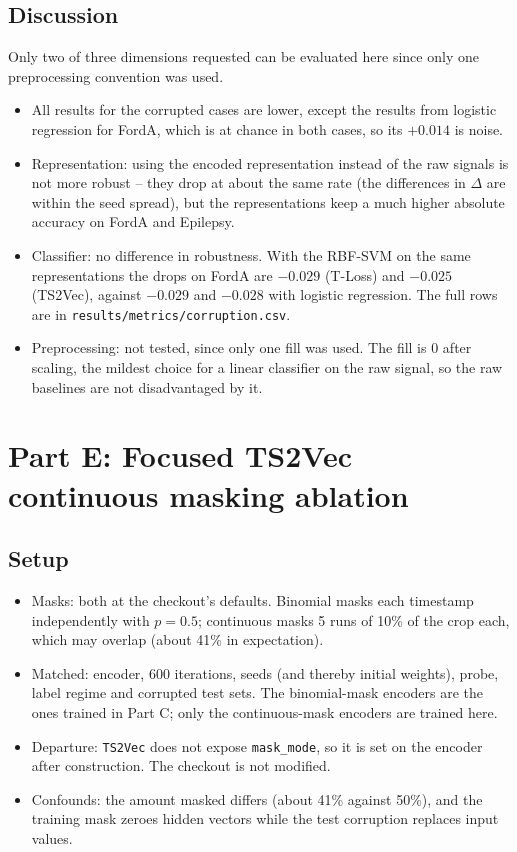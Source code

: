 \documentclass[a4paper,11pt]{article}
\newcommand{\code}[1]{\texttt{#1}}
\begin{document}
\subsection{Discussion}
Only two of three dimensions requested can be evaluated here since only one preprocessing convention was used.
\begin{itemize}
    \item All results for the corrupted cases are lower, except the results from logistic regression for FordA, which is at chance in both cases, so its $+0.014$ is noise.
    \item Representation: using the encoded representation instead of the raw signals is not more robust -- they drop at about the same rate (the differences in $\Delta$ are within the seed spread), but the representations keep a much higher absolute accuracy on FordA and Epilepsy.
    \item Classifier: no difference in robustness. With the RBF-SVM on the same representations the drops on FordA are $-0.029$ (T-Loss) and $-0.025$ (TS2Vec), against $-0.029$ and $-0.028$ with logistic regression. The full rows are in \code{results/metrics/corruption.csv}.
    \item Preprocessing: not tested, since only one fill was used. The fill is 0 after scaling, the mildest choice for a linear classifier on the raw signal, so the raw baselines are not disadvantaged by it.
\end{itemize}

\section{Part E: Focused TS2Vec continuous masking ablation}

\subsection{Setup}
\begin{itemize}
    \item Masks: both at the checkout's defaults. Binomial masks each timestamp independently with $p = 0.5$; continuous masks 5 runs of 10\% of the crop each, which may overlap (about 41\% in expectation).
    \item Matched: encoder, 600 iterations, seeds (and thereby initial weights), probe, label regime and corrupted test sets. The binomial-mask encoders are the ones trained in Part C; only the continuous-mask encoders are trained here.
    \item Departure: \code{TS2Vec} does not expose \code{mask\_mode}, so it is set on the encoder after construction. The checkout is not modified.
    \item Confounds: the amount masked differs (about 41\% against 50\%), and the training mask zeroes hidden vectors while the test corruption replaces input values.
\end{itemize}
\end{document}
